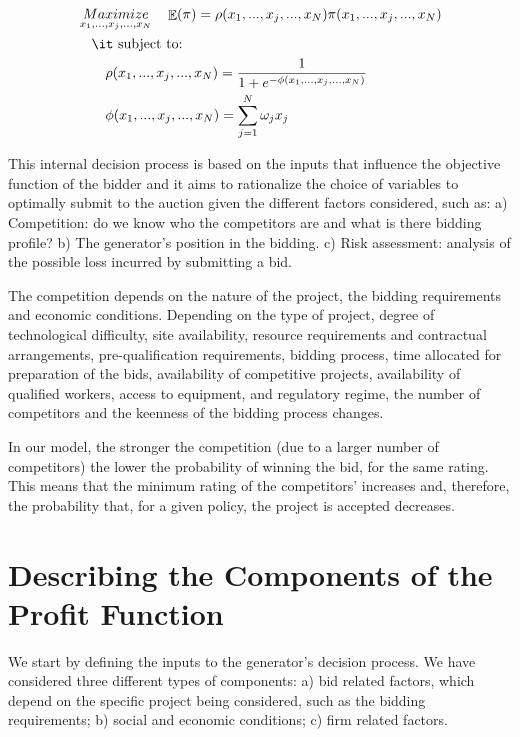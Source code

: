 \documentclass[informs]{informs3}
\begin{document}
\begin{subequations}\label{eqGeneratorsProblem}
	\begin{align}
	&\mathop {Maximize}\limits_{x_1, ..., x_j, ..., x_N}
	\quad \mathop{\mathbb{E}}(\pi)= \rho(x_1, ..., x_j, ..., x_N)\pi(x_1, ..., x_j, ..., x_N) \label{eqGenObjective}\\
	&\quad \mbox{{\it subject to}:}\notag\\
	&\qquad	\rho(x_1, ..., x_j, ..., x_N)=\frac{1}{1+e^{-\phi(x_1, ..., x_j, ..., x_N)}} \label{eqGenProbability}\\
	&\qquad	\phi(x_1, ..., x_j, ..., x_N) = \sum_{j=1}^{N}\omega_j x_j \label{eqGenRating} 
	\end{align}
\end{subequations}


This internal decision process is based on the inputs that influence the objective function of the bidder and it aims to rationalize the choice of variables to optimally submit to the auction given the different factors considered, such as: a) Competition: do we know who the competitors are and what is there bidding profile? b) The generator’s position in the bidding. c) Risk assessment: analysis of the possible loss incurred by submitting a bid.

The competition depends on the nature of the project, the bidding requirements and economic conditions. Depending on the type of project, degree of technological difficulty, site availability, resource requirements and contractual arrangements, pre-qualification requirements, bidding process, time allocated for preparation of the bids, availability of competitive projects, availability of qualified workers, access to equipment, and regulatory regime, the number of competitors and the keenness of the bidding process changes. 

In our model, the stronger the competition (due to a larger number of competitors) the lower the probability of winning the bid, for the same rating. This means that the minimum rating of the competitors’ increases and, therefore, the probability that, for a given policy, the project is accepted decreases.  


\section{Describing the Components of the Profit Function}\label{Section_profit}

We start by defining the inputs to the generator’s decision process. We have considered three different types of components: a) bid related factors, which depend on the specific project being considered, such as the bidding requirements; b) social and economic conditions; c) firm related factors. 
\end{document}

